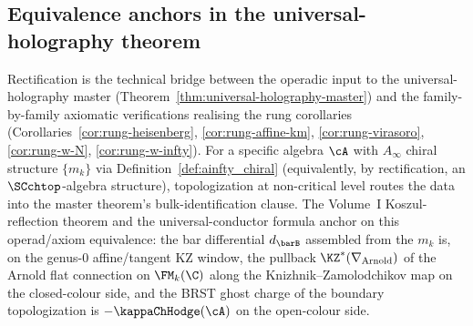 \subsection{Equivalence anchors in the universal-holography theorem}
\label{subsec:equivalence-holography-anchors}

\begin{remark}
\label{rem:equivalence-holography-anchor}%
%
Rectification is the technical bridge between the operadic input
to the universal-holography master
(Theorem~\ref{thm:universal-holography-master}) and the
family-by-family axiomatic verifications realising the rung
corollaries (Corollaries~\ref{cor:rung-heisenberg},
\ref{cor:rung-affine-km}, \ref{cor:rung-virasoro},
\ref{cor:rung-w-N}, \ref{cor:rung-w-infty}). For a specific
algebra $\cA$ with $A_\infty$ chiral structure $\{m_k\}$ via
Definition~\ref{def:ainfty_chiral} (equivalently, by
rectification, an $\SCchtop$-algebra structure), topologization
at non-critical level routes the data into the master theorem's
bulk-identification clause. The Volume~I Koszul-reflection
theorem and the universal-conductor formula anchor on this
operad/axiom equivalence: the bar differential $d_{\barB}$
assembled from the $m_k$ is, on the genus-$0$ affine/tangent KZ
window, the pullback $\KZ^*(\nabla_{\mathrm{Arnold}})$ of the Arnold
flat connection on $\FM_k(\C)$ along the
Knizhnik--Zamolodchikov map on the closed-colour side, and the
BRST ghost charge of the boundary topologization is
$-\kappaChHodge(\cA)$ on the open-colour side.
\end{remark}
